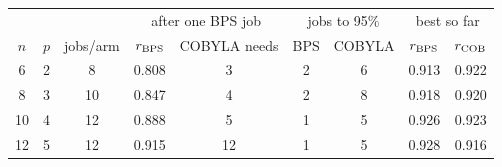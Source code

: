 \begin{tabular}{ccccccccc}
& & & \multicolumn{2}{c}{after one BPS job} & \multicolumn{2}{c}{jobs to 95\%}
 & \multicolumn{2}{c}{best so far} \\
$n$ & $p$ & jobs/arm & $r_{\rm BPS}$ & COBYLA needs & BPS & COBYLA
 & $r_{\rm BPS}$ & $r_{\rm COB}$ \\
\hline
6 & 2 & 8 & 0.808 & 3 & 2 & 6 & 0.913 & 0.922 \\
8 & 3 & 10 & 0.847 & 4 & 2 & 8 & 0.918 & 0.920 \\
10 & 4 & 12 & 0.888 & 5 & 1 & 5 & 0.926 & 0.923 \\
12 & 5 & 12 & 0.915 & 12 & 1 & 5 & 0.928 & 0.916 \\
\end{tabular}
